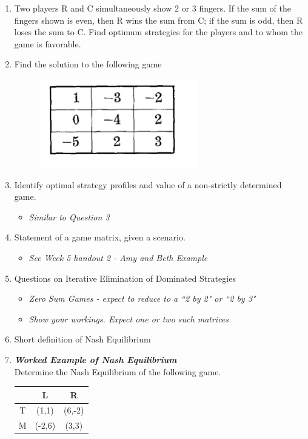 \documentclass[]{report}
\begin{document}
\begin{enumerate}
	
	\item Two players R and C simultaneously show 2 or 3 fingers. If the sum of the fingers shown is even, then R wins the sum from C; if the sum is odd, then R loses the sum to C. Find optimum strategies for the players and to whom the game is favorable. 
	
	\item 
	Find the solution to the following game 
\begin{figure}[h!]
	\centering
	\includegraphics[width=0.35\linewidth]{TutQ5}
	\label{fig:tutq5}
\end{figure}

\item Identify optimal strategy profiles and value of a non-strictly determined game.
\begin{itemize}
	
	\item \textit{Similar to Question 3}
	
\end{itemize}
\item Statement of a game matrix, given a scenario.
\begin{itemize}
	
	\item \textit{See Week 5 handout 2 - Amy and Beth Example}
	
\end{itemize}
\item Questions on Iterative Elimination of Dominated Strategies 
\begin{itemize}
\item \textit{Zero Sum Games - expect to reduce to a ``2 by 2" or ``2 by 3"}
\item \textit{Show your workings. Expect one or two such matrices}
\end{itemize}
\item Short definition of Nash Equilibrium
\item \textbf{\textit{Worked Example of Nash Equilibrium}}\\
Determine the Nash Equilibrium of the following game.

\begin{center}
	\begin{tabular}{|c|c|c|} \hline 
		&    L    & R \\ \hline 
		T  &    (1,1)    & (6,-2) \\ \hline
		M  &   (-2,6)    &  (3,3) \\ \hline
	\end{tabular}
\end{center}


\end{enumerate}
\end{document}
